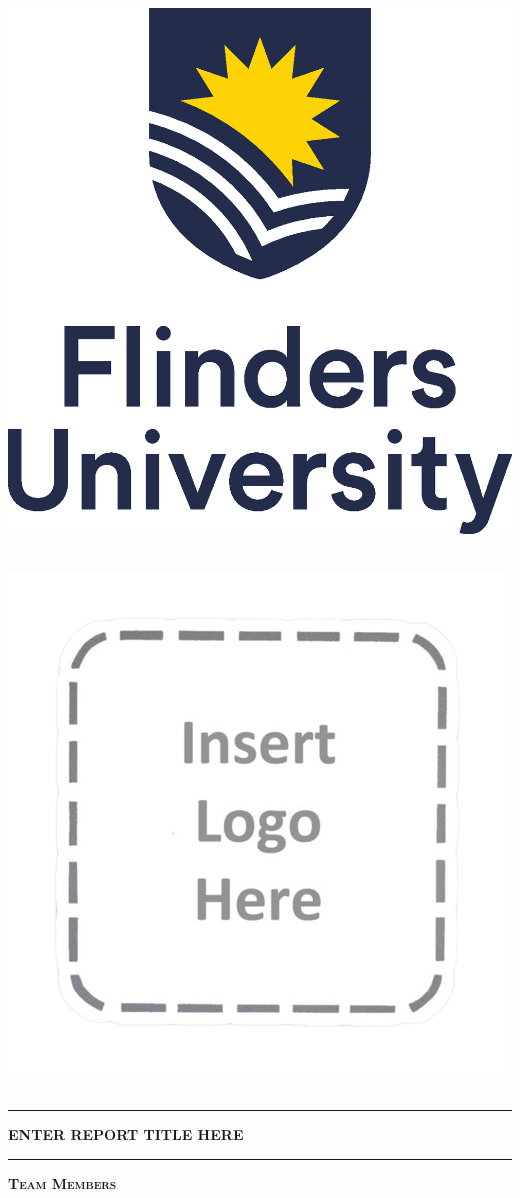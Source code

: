 \begin{titlepage}
    \begin{center}
    \begin{minipage}[c]{0.6\linewidth}
        \centering
        \includegraphics[width=0.5\linewidth]{root/Flinders_University_Logo_Stacked_RGB_Master.eps}~\\[1cm]
    \end{minipage}\vspace{0.5cm}
    \begin{minipage}[c]{0.6\linewidth}
        \centering
        \includegraphics[width=0.5\linewidth]{root/coverpage_logo_placeholder.png}~\\[1cm]
    \end{minipage}
    \vspace{1cm}
    
    \hrule
    \vspace{.5cm}
    {\huge \bfseries ENTER REPORT TITLE HERE} %
    \vspace{.5cm}
    \hrule

    \vspace{1cm}
    
    \textsc{\Large\textbf{Team Members}}\\
    \vspace{.5cm}
    \centering


\end{center}
\end{titlepage}
